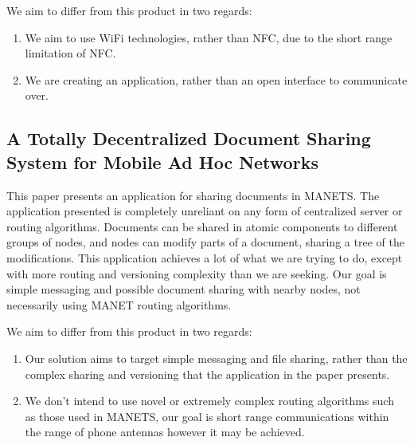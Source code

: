 \documentclass[10pt]{article}
\begin{document}
We aim to differ from this product in two regards:
\begin{enumerate}
    \item We aim to use WiFi technologies, rather than NFC, due to the short range limitation of NFC.
    \item We are creating an application, rather than an open interface to communicate over.
\end{enumerate}

\newpage

\subsection{A Totally Decentralized Document Sharing System for Mobile Ad Hoc Networks}
This paper  \cite{10.1145/1164783.1164805} presents an application for sharing documents in MANETS. The application presented
is completely unreliant on any form of centralized server or routing algorithms. Documents can be shared in atomic components to different groups
of nodes, and nodes can modify parts of a document, sharing a tree of the modifications. This application achieves a lot of what we are trying to
do, except with more routing and versioning complexity than we are seeking. Our goal is simple messaging and possible document sharing with nearby
nodes, not necessarily using MANET routing algorithms.

We aim to differ from this product in two regards:
\begin{enumerate}
    \item Our solution aims to target simple messaging and file sharing, rather than the complex sharing and versioning that the application in the paper presents.
    \item We don't intend to use novel or extremely complex routing algorithms such as those used in MANETS, our goal is short range communications within the range of phone antennas however it may be achieved.
\end{enumerate}

\end{document}
